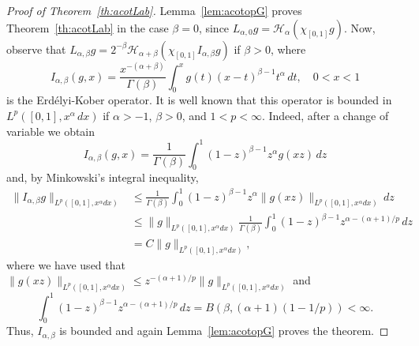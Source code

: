 \documentclass[12pt,leqno]{amsart}
\theoremstyle{plain}
\newcommand{\lpnorm}[3]{\|{#1}\|_{L^{#2}({#3})}} %
\newcommand{\htr}{\mathcal{H}} %
\newcommand{\htra}{\mathcal{H}_\alpha} %
\begin{document}
\begin{proof}[Proof of Theorem~\ref{th:acotLab}]
Lemma~\ref{lem:acotopG} proves Theorem~\ref{th:acotLab} in the case $\beta =
0$, since $L_{\alpha,0}g = \htra(\chi_{[0,1]} g)$. Now, observe that
$L_{\alpha,\beta} g = 2^{-\beta} \htr_{\alpha+\beta} (\chi_{[0,1]}
I_{\alpha,\beta}g)$ if $\beta > 0$, where
\begin{equation*}
    I_{\alpha,\beta}(g,x)
    = \frac{x^{-(\alpha+\beta)}}{\Gamma(\beta)}
      \int_{0}^x g(t)(x-t)^{\beta-1}t^{\alpha}\,dt,
    \quad 0 < x < 1
\end{equation*}
is the Erd\'elyi-Kober operator. It is well known that this operator is
bounded in $L^p([0,1], x^\alpha \, dx)$ if $\alpha > -1$, $\beta > 0$, and $1
< p < \infty$. Indeed, after a change of variable we obtain
\begin{equation*}
    I_{\alpha,\beta}(g,x)
    = \frac1{\Gamma(\beta)}\int_0^1(1-z)^{\beta-1}z^{\alpha}g(xz)\,dz
\end{equation*}
and, by Minkowski's integral inequality,
\begin{align*}
    \lpnorm{I_{\alpha,\beta}g}p{[0,1],x^{\alpha}dx}
    &\le \frac1{\Gamma(\beta)} \int_0^1(1-z)^{\beta-1}z^{\alpha} 
       \lpnorm{g(xz)}p{[0,1],x^{\alpha}dx}\,dz \\
    &\le \lpnorm{g}p{[0,1],x^{\alpha}dx} \frac1{\Gamma(\beta)}
       \int_0^1(1-z)^{\beta-1}z^{\alpha-{(\alpha+1)}/p}\,dz \\
    &= C \lpnorm{g}p{[0,1],x^{\alpha}dx},
\end{align*}
where we have used that $\lpnorm{g(xz)}p{[0,1],x^{\alpha}dx} \le
z^{-(\alpha+1)/p}\lpnorm{g}p{[0,1],x^{\alpha}dx}$ and
\begin{equation*}
    \int_0^1(1-z)^{\beta-1}z^{\alpha-{(\alpha+1)}/p}\,dz
    = B(\beta,(\alpha+1)(1-1/p)) < \infty.
\end{equation*}
Thus, $I_{\alpha,\beta}$ is bounded and again Lemma~\ref{lem:acotopG} proves
the theorem.
\end{proof}
\end{document}

